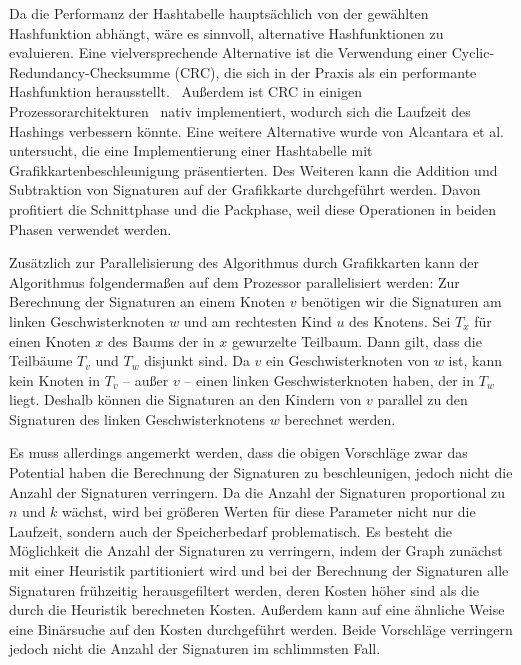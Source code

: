 Da die Performanz der Hashtabelle hauptsächlich von der gewählten Hashfunktion abhängt, wäre es sinnvoll, alternative Hashfunktionen zu evaluieren.
Eine vielversprechende Alternative ist die Verwendung einer Cyclic\hyp Redundancy\hyp Checksumme (CRC), die sich in der Praxis als ein performante Hashfunktion herausstellt.~\cite{MPL09, Hua+11}
Außerdem ist CRC in einigen Prozessorarchitekturen~\cite{SSE} nativ implementiert, wodurch sich die Laufzeit des Hashings verbessern könnte.
Eine weitere Alternative wurde von Alcantara et al.~\cite{Alc+09} untersucht, die eine Implementierung einer Hashtabelle mit Grafikkartenbeschleunigung präsentierten.
Des Weiteren kann die Addition und Subtraktion von Signaturen auf der Grafikkarte durchgeführt werden.
Davon profitiert die Schnittphase und die Packphase, weil diese Operationen in beiden Phasen verwendet werden.

Zusätzlich zur Parallelisierung des Algorithmus durch Grafikkarten kann der Algorithmus folgendermaßen auf dem Prozessor parallelisiert werden:
Zur Berechnung der Signaturen an einem Knoten $v$ benötigen wir die Signaturen am linken Geschwisterknoten $w$ und am rechtesten Kind $u$ des Knotens.
Sei $T_x$ für einen Knoten $x$ des Baums der in $x$ gewurzelte Teilbaum.
Dann gilt, dass die Teilbäume $T_v$ und $T_w$ disjunkt sind.
Da $v$ ein Geschwisterknoten von $w$ ist, kann kein Knoten in $T_v$ -- außer $v$ -- einen linken Geschwisterknoten haben, der in $T_w$ liegt.
Deshalb können die Signaturen an den Kindern von $v$ parallel zu den Signaturen des linken Geschwisterknotens $w$ berechnet werden.

Es muss allerdings angemerkt werden, dass die obigen Vorschläge zwar das Potential haben die Berechnung der Signaturen zu beschleunigen, jedoch nicht die Anzahl der Signaturen verringern.
Da die Anzahl der Signaturen proportional zu $n$ und $k$ wächst, wird bei größeren Werten für diese Parameter nicht nur die Laufzeit, sondern auch der Speicherbedarf problematisch.
Es besteht die Möglichkeit die Anzahl der Signaturen zu verringern, indem der Graph zunächst mit einer Heuristik partitioniert wird und bei der Berechnung der Signaturen alle Signaturen frühzeitig herausgefiltert werden, deren Kosten höher sind als die durch die Heuristik berechneten Kosten.
Außerdem kann auf eine ähnliche Weise eine Binärsuche auf den Kosten durchgeführt werden.
Beide Vorschläge verringern jedoch nicht die Anzahl der Signaturen im schlimmsten Fall.
